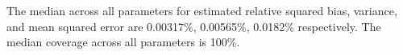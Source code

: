 The median across all parameters for  estimated relative squared bias, variance, and mean squared error are 0.00317\%, 0.00565\%, 0.0182\% respectively. The median coverage across all parameters is 100\%.